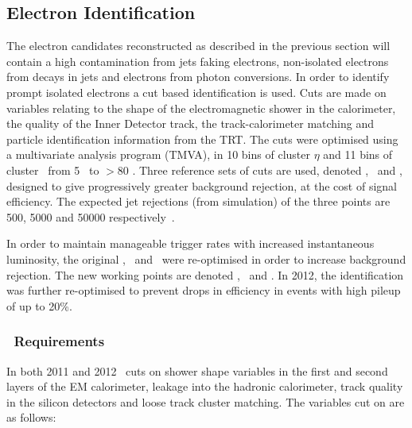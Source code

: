 \subsection{Electron Identification}
\label{sec:reco-el-id}

The electron candidates reconstructed as described in the previous section will
contain a high contamination from jets faking electrons, non-isolated electrons
from decays in jets and electrons from photon conversions. In order to identify
prompt isolated electrons a
cut based identification is used. Cuts are made on variables relating to the
shape of the electromagnetic shower in the calorimeter, the quality of the Inner Detector track, the
track-calorimeter matching and particle identification information from the
TRT. The cuts were optimised using a multivariate analysis program (TMVA), in 10 bins
of cluster $\eta$ and 11 bins of cluster \et\ from 5 \gev\ to $>80$ \gev.
Three reference sets of cuts are used, denoted \loose, \medium\ and \tight,
designed to give progressively greater background rejection, at the cost of
signal efficiency. The expected jet rejections (from simulation) of the three points are 500, 5000
and 50000 respectively~\cite{ATL-PHYS-PUB-2011-006}.

In order to maintain manageable trigger rates with increased instantaneous
luminosity, the original \loose, \medium\ and \tight\ were re-optimised in order
to increase background rejection. The new working points are denoted \loosePP,
\mediumPP\ and \tightPP. In 2012, the identification was further re-optimised to
prevent drops in efficiency in events with high pileup of up to 20\%. 

\subsubsection{\loosePP\ Requirements}

In both 2011 and 2012 \loosePP\ cuts on shower shape variables in the first and
second layers of the EM calorimeter, leakage into the hadronic
calorimeter, track quality in the silicon detectors and loose track cluster
matching. The variables cut on are as follows:

